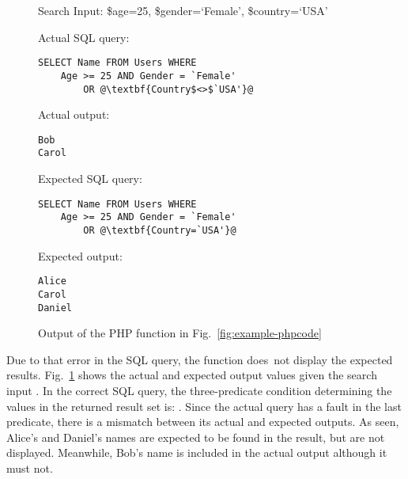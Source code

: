 \begin{figure}[t]
    \centering
    \footnotesize
\begin{minipage}[t]{0.985\columnwidth}
Search Input: \textsf{\$age=25, \$gender=`Female', \$country=`USA'}
\end{minipage}

\vspace{4pt}
\begin{minipage}[t]{0.63\columnwidth}
Actual SQL query:
\begin{lstlisting}[numbers=none,xleftmargin=4pt]
SELECT Name FROM Users WHERE
    Age >= 25 AND Gender = `Female'
        OR @\textbf{Country$<>$`USA'}@
\end{lstlisting}
\end{minipage}
\hspace{0.03\columnwidth}
\begin{minipage}[t]{0.30\columnwidth}
Actual output:
\begin{lstlisting}[numbers=none,xleftmargin=4pt]
Bob
Carol
\end{lstlisting}
\end{minipage}

\begin{minipage}[t]{0.63\columnwidth}
Expected SQL query:
\begin{lstlisting}[numbers=none,xleftmargin=4pt]
SELECT Name FROM Users WHERE
    Age >= 25 AND Gender = `Female'
        OR @\textbf{Country=`USA'}@
\end{lstlisting}
\end{minipage}
\hspace{0.03\columnwidth}
\begin{minipage}[t]{0.30\columnwidth}
Expected output:
\begin{lstlisting}[numbers=none,xleftmargin=4pt]
Alice
Carol
Daniel
\end{lstlisting}
\end{minipage}
%
    \caption{Output of the PHP function in Fig.~\ref{fig:example-phpcode}}\label{fig:example-output}
\end{figure}




Due to that error in the SQL query, the function does~not display the
expected results. Fig.~\ref{fig:example-output} shows the actual and
expected output values given the search input . In the correct SQL query, the
three-predicate condition determining the values in the returned
result set is:   
 . Since the actual query has a fault
in the last predicate, there is a mismatch between its actual and
expected outputs. As seen, Alice's and Daniel's names are expected to
be found in the result, but are not displayed. Meanwhile, Bob's name
is included in the actual output although it must not.

